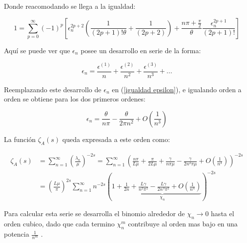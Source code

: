 Donde reacomodando se llega a la igualdad:

\begin{equation}
    1 = 
    \sum _{p=0} ^{\infty} (-1) ^p     \left[
   	\epsilon _n ^{2p+2 }\left( \frac{1}{(2p+1)! \theta } + \frac{1}{(2p+2)} \right) +
  	\frac{n \pi + \frac{\pi}{2}}{\theta} \frac{  \epsilon _n ^{2p+1}}{(2p+1)!} 			\right]
\label{igualdad epsilon}
\end{equation}

Aquí se puede ver que  $\epsilon _n $ posee un desarrollo en serie de la forma:

\begin{equation}
    \epsilon _n = 
    \frac{\epsilon ^{(1)}}{n}  + 
    \frac{\epsilon ^{(2)}}{n ^2}  + 
    \frac{\epsilon ^{(3)}}{n ^3}  + ...
\label{eq.epsilon}
\end{equation}


Reemplazando este desarrollo de $\epsilon _n$ en (\ref{igualdad epsilon}), e igualando orden a orden se obtiene para los dos primeros ordenes:

\begin{equation}
    \epsilon _n = \frac{\theta}{n \pi} 
     - \frac{ \theta}{2 \pi n ^2 } + O \left( \frac{1}{n ^3}\right) 
\label{epsilons}
\end{equation}

\newpage


La función $ \zeta _A (s)$ queda expresada a este orden como:
    
\begin{equation}
\begin{aligned}
    \zeta _{A} (s) &=  
    \sum _{n=1} ^{\infty} 
    \left( \frac{\lambda _n }{\mu} 
    	\right) ^ {-2 s}  =
    \sum _{n=1} ^{\infty} 
    \left(
	\frac{n \pi}{L \mu} + 
    \frac{\pi}{2 L \mu} +
    \frac{\gamma}{n \pi \mu } -
    \frac{\gamma}{2 n ^2 \pi \mu } +
    O \left(  \frac{1}{n^3} \right) 
    \right) ^{-2 s}  \\[5pt]
    &= \left( \frac{L \mu }{\pi} \right) ^{2s}    
    \sum _{n=1} ^{\infty} 
    n ^{- 2 s} 
    \left(
    1 +     
    \underbrace{
        \frac{1}{2 n} + 
        \frac{L \gamma}{n^2 \pi ^2} -
        \frac{L \gamma}{2 n ^3 \pi ^2} +
        O \left( \frac{1}{n ^{4}} \right) } _{ \chi _n}
    \right ) ^{-2 s}
\end{aligned}
\end{equation}

Para calcular esta serie se desarrolla el binomio alrededor de $\chi _n \rightarrow{0} $ hasta el orden cubico, dado que  cada termino $\chi _{n} ^{m} $ contribuye al orden mas bajo en una potencia $\frac{1}{n ^m}$ .


